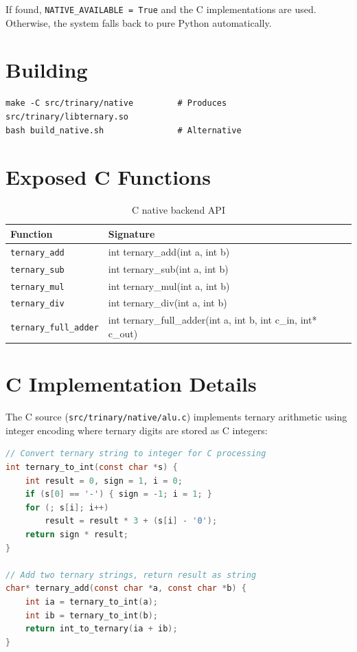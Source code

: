 \documentclass[10pt,a4paper,twoside]{book}
\begin{document}
If found, \texttt{NATIVE\_AVAILABLE = True} and the C implementations are used.
Otherwise, the system falls back to pure Python automatically.

\section{Building}

\begin{verbatim}
make -C src/trinary/native         # Produces src/trinary/libternary.so
bash build_native.sh               # Alternative
\end{verbatim}

\section{Exposed C Functions}

\begin{table}[H]
\centering
\caption{C native backend API}
\label{tab:nativeapi}
\begin{tabular}{ll}
\toprule
Function & Signature \\
\midrule
\texttt{ternary\_add} & int ternary\_add(int a, int b) \\
\texttt{ternary\_sub} & int ternary\_sub(int a, int b) \\
\texttt{ternary\_mul} & int ternary\_mul(int a, int b) \\
\texttt{ternary\_div} & int ternary\_div(int a, int b) \\
\texttt{ternary\_full\_adder} & int ternary\_full\_adder(int a, int b, int c\_in, int* c\_out) \\
\bottomrule
\end{tabular}
\end{table}

\section{C Implementation Details}

The C source (\texttt{src/trinary/native/alu.c}) implements ternary arithmetic
using integer encoding where ternary digits are stored as C integers:

\begin{lstlisting}[language=C]
// Convert ternary string to integer for C processing
int ternary_to_int(const char *s) {
    int result = 0, sign = 1, i = 0;
    if (s[0] == '-') { sign = -1; i = 1; }
    for (; s[i]; i++)
        result = result * 3 + (s[i] - '0');
    return sign * result;
}

// Add two ternary strings, return result as string
char* ternary_add(const char *a, const char *b) {
    int ia = ternary_to_int(a);
    int ib = ternary_to_int(b);
    return int_to_ternary(ia + ib);
}
\end{lstlisting}
\end{document}
